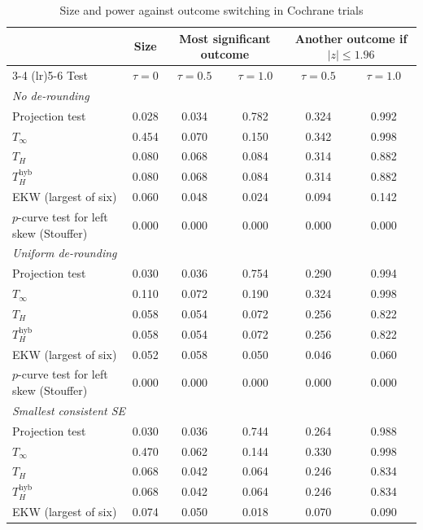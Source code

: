 \begin{table}[htbp]
\centering
\caption{Size and power against outcome switching in Cochrane trials}
\label{tab:cochrane_switching_power_desktop_main}
\footnotesize
\setlength{\tabcolsep}{4pt}
\begin{tabular}{lccccc}
\toprule
 & Size & \multicolumn{2}{c}{Most significant outcome} & \multicolumn{2}{c}{Another outcome if $|z| \le 1.96$} \\
\cmidrule(lr){3-4} \cmidrule(lr){5-6}
Test & $\tau = 0$ & $\tau = 0.5$ & $\tau = 1.0$ & $\tau = 0.5$ & $\tau = 1.0$ \\
\midrule
\multicolumn{6}{l}{\textit{No de-rounding}} \\
Projection test & 0.028 & 0.034 & 0.782 & 0.324 & 0.992 \\
$T_\infty$ & 0.454 & 0.070 & 0.150 & 0.342 & 0.998 \\
$T_H$ & 0.080 & 0.068 & 0.084 & 0.314 & 0.882 \\
$T_H^{\mathrm{hyb}}$ & 0.080 & 0.068 & 0.084 & 0.314 & 0.882 \\
EKW (largest of six) & 0.060 & 0.048 & 0.024 & 0.094 & 0.142 \\
$p$-curve test for left skew (Stouffer) & 0.000 & 0.000 & 0.000 & 0.000 & 0.000 \\
\midrule
\multicolumn{6}{l}{\textit{Uniform de-rounding}} \\
Projection test & 0.030 & 0.036 & 0.754 & 0.290 & 0.994 \\
$T_\infty$ & 0.110 & 0.072 & 0.190 & 0.324 & 0.998 \\
$T_H$ & 0.058 & 0.054 & 0.072 & 0.256 & 0.822 \\
$T_H^{\mathrm{hyb}}$ & 0.058 & 0.054 & 0.072 & 0.256 & 0.822 \\
EKW (largest of six) & 0.052 & 0.058 & 0.050 & 0.046 & 0.060 \\
$p$-curve test for left skew (Stouffer) & 0.000 & 0.000 & 0.000 & 0.000 & 0.000 \\
\midrule
\multicolumn{6}{l}{\textit{Smallest consistent SE}} \\
Projection test & 0.030 & 0.036 & 0.744 & 0.264 & 0.988 \\
$T_\infty$ & 0.470 & 0.062 & 0.144 & 0.330 & 0.998 \\
$T_H$ & 0.068 & 0.042 & 0.064 & 0.246 & 0.834 \\
$T_H^{\mathrm{hyb}}$ & 0.068 & 0.042 & 0.064 & 0.246 & 0.834 \\
EKW (largest of six) & 0.074 & 0.050 & 0.018 & 0.070 & 0.090 \\

\end{tabular}
\end{table}
